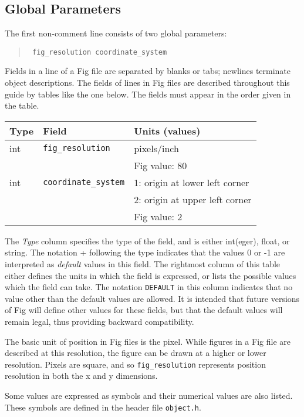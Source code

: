 \subsection{Global Parameters}
The first non-comment line consists of two global parameters:
%
\begin{quote}
\tt
fig\_resolution coordinate\_system
\end{quote}
%
Fields in a line of a Fig file are separated by blanks or tabs;
	newlines terminate object descriptions.
The fields of lines in Fig files are described throughout this
	guide by tables like the one below.
The fields must appear in the order given in the table.
%
\vspace{2pt}
\begin{center}
\begin{tabular}{|l|l|l|}
\hline
Type 	& Field				& Units (values)		\\
\hline
\hline
int 	& {\tt fig\_resolution}		& pixels/inch			\\
	&				& Fig value: 80			\\
\hline
int	& {\tt coordinate\_system}	& 1: origin at lower left corner\\
	&				& 2: origin at upper left corner\\
	&				& Fig value: 2			\\ 
\hline
\end{tabular}
\end{center}
\vspace{2pt}

The {\em Type} column specifies the type of the field,
	and is either int(eger), float, or string.
The notation + following the type indicates that the values 0 or -1
	 are interpreted as {\em default} values in this field.
The rightmost column of this table either defines the units in which
	the field is expressed, or lists the possible values which
	the field can take.
The notation {\tt DEFAULT} in this column indicates that no value other
	than the default values are allowed.
It is intended that future versions of Fig will define other values for
	these fields, but that the default values will remain legal,
	thus providing backward compatibility.

The basic unit of position in Fig files is the pixel.
While figures in a Fig file are described at this resolution,
	the figure can be drawn at a higher or lower resolution.
Pixels are square, and so \verb|fig_resolution| represents position
	resolution in both the x and y dimensions.

Some values are expressed as symbols and their numerical values are also listed.
These symbols are defined in the header file {\tt object.h}.

